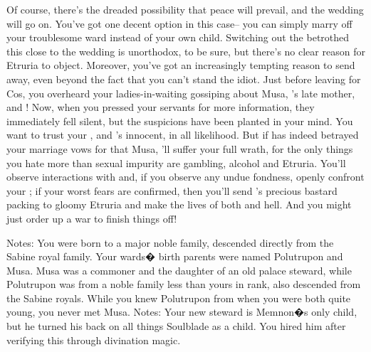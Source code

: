\documentclass[char]{Kos}
\begin{document}
Of course, there's the dreaded possibility that peace will prevail, and the wedding will go on. You've got one decent option in this case-- you can simply marry off your troublesome ward instead of your own child. Switching out the betrothed this close to the wedding is unorthodox, to be sure, but there's no clear reason for Etruria to object. Moreover, you've got an increasingly tempting reason to send \cWard{\them} away, even beyond the fact that you can't stand the idiot. Just before leaving for Cos, you overheard your ladies-in-waiting gossiping about Musa, \cWard{\nickname}'s late mother, and \cScythiaKing{}! Now, when you pressed your servants for more information, they immediately fell silent, but the suspicions have been planted in your mind. You want to trust your , and \cScythiaKing{\they}'s innocent, in all likelihood. But if \cScythiaKing{} has indeed betrayed your marriage vows for that Musa, \cScythiaKing{\they}'ll suffer your full wrath, for the only things you hate more than sexual impurity are gambling, alcohol and Etruria. You'll observe \cScythiaKing{\their} interactions with \cWard{\nickname} and, if you observe any undue fondness, openly confront your \cScythiaKing{\spouse}; if your worst fears are confirmed, then you'll  send \cScythiaKing{}'s precious bastard packing to gloomy Etruria and make the lives of both \cScythiaKing{\parent} and \cWard{\child} hell. And you might just order up a war to finish things off! 

Notes: You were born to a major noble family, descended directly from the Sabine royal family. Your wards� birth parents were named Polutrupon and Musa. Musa was a commoner and the daughter of an old palace steward, while Polutrupon was from a noble family less than yours in rank, also descended from the Sabine royals. While you knew Polutrupon from when you were both quite young, you never met Musa.
Notes: Your new steward is Memnon�s only child, but he turned his back on all things Soulblade as a child. You hired him after verifying this through divination magic. 
\end{document}
